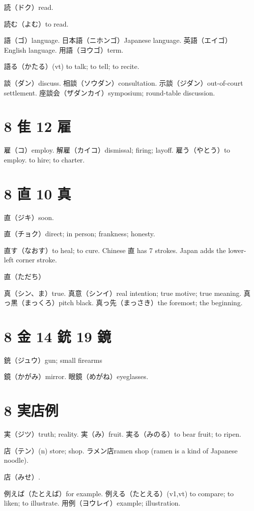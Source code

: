 読（ドク）read.

読む（よむ）to read.

語（ゴ）language.
日本語（ニホンゴ）Japanese language.
英語（エイゴ）English language.
用語（ヨウゴ）term.

語る（かたる）(vt) to talk; to tell; to recite.

談（ダン）discuss.
相談（ソウダン）consultation.
示談（ジダン）out-of-court settlement.
座談会（ザダンカイ）symposium; round-table discussion.

\section{8 隹 12 雇}

雇（コ）employ.
解雇（カイコ）dismissal; firing; layoff.
雇う（やとう）to employ. to hire; to charter.

\section{8 直 10 真}

直（ジキ）soon.

直（チョク）direct; in person; frankness; honesty.

直す（なおす）to heal; to cure.
Chinese 直 has 7 strokes.
Japan adds the lower-left corner stroke.

直（ただち）

真（シン、ま）true.
真意（シンイ）real intention; true motive; true meaning.
真っ黒（まっくろ）pitch black.
真っ先（まっさき）the foremost; the beginning.

\section{8 金 14 銃 19 鏡}

銃（ジュウ）gun; small firearms

鏡（かがみ）mirror.
眼鏡（めがね）eyeglasses.

\section{8 実店例}

実（ジツ）truth; reality.
実（み）fruit.
実る（みのる）to bear fruit; to ripen.

店（テン）(n) store; shop.
ラメン店ramen shop (ramen is a kind of Japanese noodle).

店（みせ）.

例えば（たとえば）for example.
例える（たとえる）(v1,vt)
to compare; to liken; to illustrate.
用例（ヨウレイ）example; illustration.


